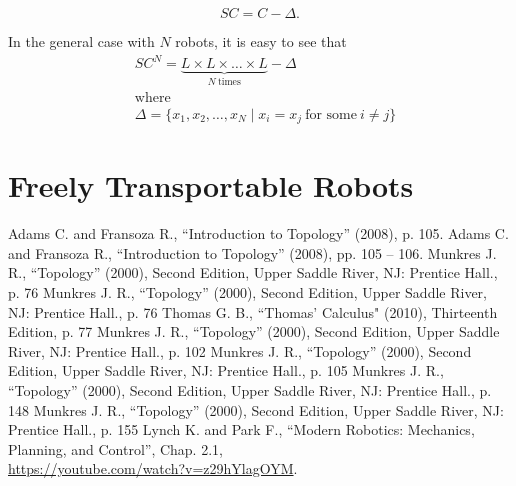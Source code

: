 \documentclass[a4paper, twocolumn]{article}
\theoremstyle{definition}
\begin{document}
$$SC = C - \Delta.$$

In the general case with $N$ robots, it is easy to see that
\begin{align*}
&SC^N = \underbrace{L \times L \times \dots \times L}_{N \ \text{times}} - \Delta\\
&\text{where}\\
&\Delta = \{x_1, x_2, \dots, x_N \mid x_i = x_j \ \text{for some} \ i \neq j\}
\end{align*}


\section*{Freely Transportable Robots}


\begin{center}
\begin{thebibliography}{00}
     Adams C. and Fransoza R., ``Introduction to Topology'' (2008), p. 105.
     Adams C. and Fransoza R., ``Introduction to Topology'' (2008), pp. 105 -- 106.
     Munkres J. R., ``Topology'' (2000), Second Edition, Upper Saddle River, NJ: Prentice Hall., p. 76
     Munkres J. R., ``Topology'' (2000), Second Edition, Upper Saddle River, NJ: Prentice Hall., p. 76
     Thomas G. B., ``Thomas' Calculus" (2010), Thirteenth Edition, p. 77
     Munkres J. R., ``Topology'' (2000), Second Edition, Upper Saddle River, NJ: Prentice Hall., p. 102
     Munkres J. R., ``Topology'' (2000), Second Edition, Upper Saddle River, NJ: Prentice Hall., p. 105
     Munkres J. R., ``Topology'' (2000), Second Edition, Upper Saddle River, NJ: Prentice Hall., p. 148
     Munkres J. R., ``Topology'' (2000), Second Edition, Upper Saddle River, NJ: Prentice Hall., p. 155
     Lynch K. and Park F., ``Modern Robotics: Mechanics, Planning, and Control'', Chap. 2.1, \\\href{https://youtube.com/watch?v=z29hYlagOYM}{https://youtube.com/watch?v=z29hYlagOYM}.
\end{thebibliography}
\end{center}
\end{document}
